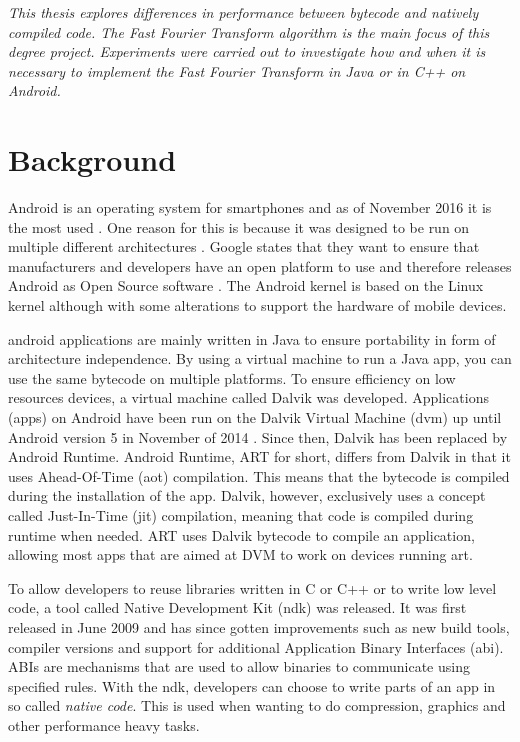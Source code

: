 \textit{This thesis explores differences in performance between bytecode and natively compiled code. The Fast Fourier Transform algorithm is the main focus of this degree project. Experiments were carried out to investigate how and when it is necessary to implement the Fast Fourier Transform in Java or in C++ on Android.}

\section{Background}
Android is an operating system for smartphones and as of November 2016 it is the most used \cite{android:os:popularity}. One reason for this is because it was designed to be run on multiple different architectures \cite{android:os:devices}. Google states that they want to ensure that manufacturers and developers have an open platform to use and therefore releases Android as Open Source software \cite{android:os:opensource}. The Android kernel is based on the Linux kernel although with some alterations to support the hardware of mobile devices.

\gls{android} applications are mainly written in Java to ensure portability in form of architecture independence. By using a virtual machine to run a Java app, you can use the same bytecode on multiple platforms. To ensure efficiency on low resources devices, a virtual machine called Dalvik was developed. Applications (apps) on Android have been run on the Dalvik Virtual Machine (\gls{dvm}) up until Android version 5 \cite{android:dalvik} in November of 2014 \cite{android:dalvik:release}. Since then, Dalvik has been replaced by Android Runtime. Android Runtime, ART for short, differs from Dalvik in that it uses Ahead-Of-Time (\gls{aot}) compilation. This means that the bytecode is compiled during the installation of the app. Dalvik, however, exclusively uses a concept called Just-In-Time (\gls{jit}) compilation, meaning that code is compiled during runtime when needed. ART uses Dalvik bytecode to compile an application, allowing most apps that are aimed at DVM to work on devices running \gls{art}.

To allow developers to reuse libraries written in C or C++ or to write low level code, a tool called Native Development Kit (\gls{ndk}) was released. It was first released in June 2009 \cite{Lin2011} and has since gotten improvements such as new build tools, compiler versions and support for additional Application Binary Interfaces (\gls{abi}). ABIs are mechanisms that are used to allow binaries to communicate using specified rules. With the \gls{ndk}, developers can choose to write parts of an app in so called \emph{native code}. This is used when wanting to do compression, graphics and other performance heavy tasks.


